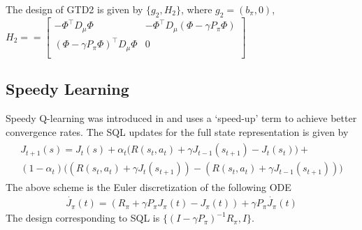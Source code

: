 The design of GTD2 is given by $\{g_2,H_2\}$, where $g_2=(b_\pi,0)$, $H_2==\begin{bmatrix}-\Phi^\top D_\mu\Phi &-\Phi^\top D_\mu (\Phi -\gamma P_\pi\Phi) \\ (\Phi -\gamma P_\pi\Phi)^\top D_\mu\Phi &0 \\ \end{bmatrix}$
\subsection{Speedy Learning}
Speedy Q-learning was introduced in \cite{} and uses a `speed-up’ term to achieve better convergence rates. The SQL updates for the full state representation is given by
\begin{align}\label{sql}
\begin{split}
J_{t+1}(s)=J_t(s)+\alpha_t\big(R(s_t,a_t)+\gamma J_{t-1}(s_{t+1})-J_{t}(s_t) \big)+\\(1-\alpha_t)\big((R(s_t,a_t)+\gamma J_t(s_{t+1}))-(R(s_t,a_t)+\gamma J_{t-1}(s_{t+1}))\big)
\end{split}
\end{align}
The above scheme is the Euler discretization of the following ODE
\begin{align}
\dot{J_\pi}(t)=(R_\pi+\gamma P_\pi J_\pi(t) -J_\pi(t))+\gamma P_\pi\dot{J_\pi}(t)
\end{align}
The design corresponding to SQL is $\{(I-\gamma P_\pi)^{-1}R_\pi,I\}$.